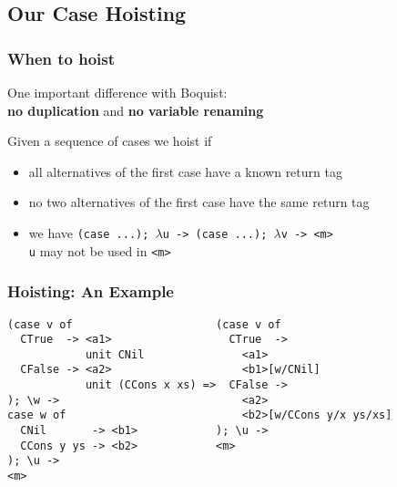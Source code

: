 \documentclass{beamer}
\begin{document}
\subsection{Our Case Hoisting}
\begin{frame}[fragile]
\frametitle{When to hoist}
One important difference with Boquist: \\
\textbf{no duplication} and \textbf{no variable renaming}

\vspace{1cm}

Given a sequence of cases we hoist if
\begin{itemize}
\item all alternatives of the first case have a known return tag
\item no two alternatives of the first case have the same return tag
\item we have \texttt{(case ...); $\lambda$u -> (case ...); $\lambda$v -> <m>}\\
\texttt{u} may not be used in \texttt{<m>}
\end{itemize}

\end{frame}



\begin{frame}[fragile]
\frametitle{Hoisting: An Example}
\begin{verbatim}
(case v of                      (case v of                     
  CTrue  -> <a1>                  CTrue  -> 
            unit CNil               <a1>                              
  CFalse -> <a2>                    <b1>[w/CNil]                      
            unit (CCons x xs) =>  CFalse ->                           
); \w ->                            <a2>                              
case w of                           <b2>[w/CCons y/x ys/xs]           
  CNil       -> <b1>            ); \u ->                              
  CCons y ys -> <b2>            <m>                                   
); \u ->
<m>
\end{verbatim}
\end{frame}
\end{document}
